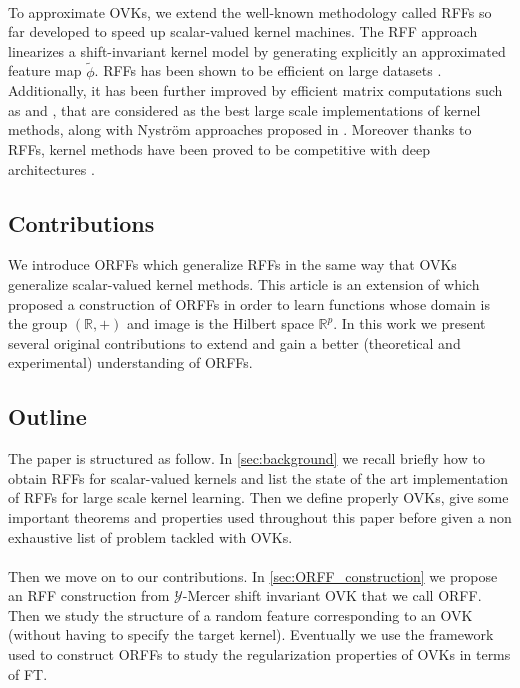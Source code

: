 \documentclass[twoside,11pt]{article}
\begin{document}
\paragraph{}
To approximate \acsp{OVK}, we extend the well-known methodology called
\acfp{RFF} \citep{Rahimi2007, Le2013, Yang2015, sriper2015, Bach2015,
sutherland2015, rudi2016generalization} so far developed to speed up
scalar-valued kernel machines. The \acs{RFF} approach linearizes a
shift-invariant kernel model by generating explicitly an approximated feature
map $\tilde{\phi}$. \acsp{RFF} has been shown to be efficient on large datasets
\citep{rudi2016generalization}.  Additionally, it has been further improved by
efficient matrix computations such as \citep[``FastFood'']{Le2013} and
\citep[``SORF'']{felix2016orthogonal}, that are considered as the best large
scale implementations of kernel methods, along with Nystr\"om approaches
proposed in \citet{drineas2005nystrom}. Moreover thanks to \acsp{RFF}, kernel
methods have been proved to be competitive with deep architectures
\citep{lu2014scale, dai2014scalable, yang2015deep}.

\subsection{Contributions}
We introduce \aclp{ORFF} which generalize \aclp{RFF} in the same way that
\acp{OVK} generalize scalar-valued kernel methods. This article is an extension
of \citet{brault2016random} which proposed a construction of \acp{ORFF} in
order to learn functions whose domain is the group $(\mathbb{R}, +)$ and image
is the Hilbert space $\mathbb{R}^p$. In this work we present several original
contributions to extend and gain a better (theoretical and experimental)
understanding of \acp{ORFF}.

\subsection{Outline}
The paper is structured as follow. In \cref{sec:background} we recall briefly
how to obtain \acp{RFF} for scalar-valued kernels and list the state of the
art implementation of \acp{RFF} for large scale kernel learning. Then we
define
properly \aclp{OVK}, give some important theorems and properties used
throughout this paper before given a non exhaustive list of problem tackled
with \acsp{OVK}.
\paragraph{}
Then we move on to our contributions. In \cref{sec:ORFF_construction} we
propose an \acs{RFF} construction from $\mathcal{Y}$-Mercer shift invariant
\acs{OVK} that we call \acf{ORFF}. Then we study the structure of a random
feature corresponding to an \acs{OVK} (without having to specify the target
kernel). Eventually we use the framework used to construct \acsp{ORFF} to study
the regularization properties of \acsp{OVK} in terms of \acl{FT}.
\end{document}
